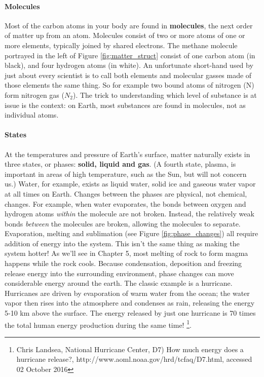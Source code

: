 \paragraph{Molecules}
Most of the carbon atoms in your body are found in \textbf{molecules}, the next order of matter up from an atom. Molecules consist of two or more atoms of one or more elements, typically joined by shared electrons. The methane molecule portrayed in the left of Figure \ref{fig:matter_struct} consist of one carbon atom (in black), and four hydrogen atoms (in white). An unfortunate short-hand used by just about every scientist is to call both elements and molecular gasses made of those elements the same thing. So for example two bound atoms of nitrogen (N) form nitrogen gas ($N_{2}$). The trick to understanding which level of substance is at issue is the context: on Earth, most substances are found in molecules, not as individual atoms.

\paragraph{States}
At the temperatures and pressure of Earth's surface, matter naturally exists in three states, or phases: \textbf{solid, liquid and gas}. (A fourth state, plasma, is important in areas of high temperature, such as the Sun, but will not concern us.) Water, for example, exists as liquid water, solid ice and gaseous water vapor at all times on Earth. Changes between the phases are physical, not chemical, changes. For example, when water evaporates, the bonds between oxygen and hydrogen atoms \emph{within} the molecule are not broken. Instead, the relatively weak bonds \emph{between} the molecules are broken, allowing the molecules to separate. Evaporation, melting and sublimation (see Figure \ref{fig:phase_changes}) all require addition of energy into the system. This isn't the same thing as making the system hotter! As we'll see in Chapter 5, most melting of rock to form magma happens while the rock cools. Because condensation, deposition and freezing release energy into the surrounding environment, phase changes can move considerable energy around the earth. The classic example is a hurricane. Hurricanes are driven by evaporation of warm water from the ocean; the water vapor then rises into the atmosphere and condenses as rain, releasing the energy 5-10 km above the surface. The energy released by just one hurricane is 70 times the total human energy production during the same time! \footnote{Chris Landsea, National  Hurricane Center,  D7) How much energy does a hurricane release?, http://www.aoml.noaa.gov/hrd/tcfaq/D7.html, accessed 02 October 2016}.

